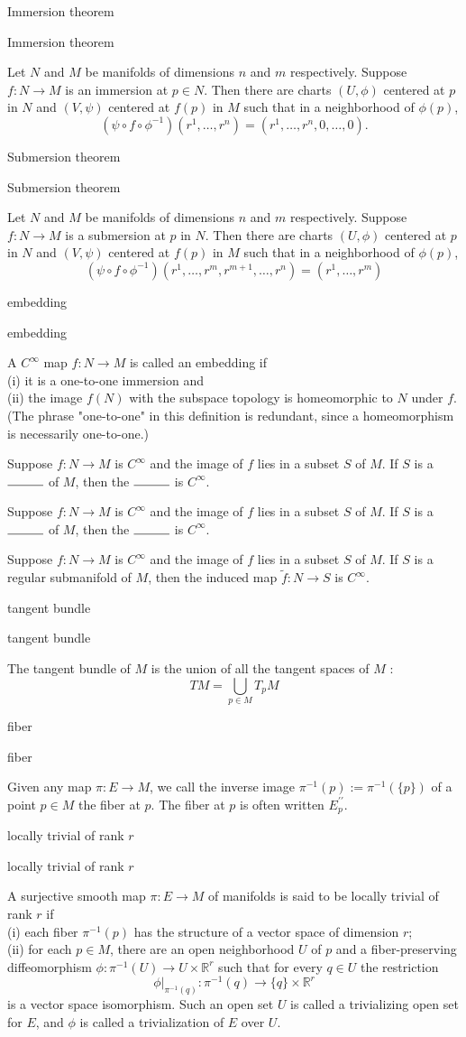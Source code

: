 \documentclass[17pt]{extarticle}
\newcommand{\boxset}[2]{\begin{mdframed}[style=darkQuesion]
#1
\end{mdframed}
\newpage
\begin{mdframed}[style=darkQuesion]
  #1
    \end{mdframed}
\begin{mdframed}[style=darkAnswer]
  #2
    \end{mdframed}
    \newpage
}
\begin{document}
\boxset{Immersion theorem}
{Let $N$ and $M$ be manifolds of dimensions $n$ and $m$ respectively. Suppose $f: N \rightarrow M$ is an immersion at $p \in N$. Then there are charts $(U, \phi)$ centered at $p$ in $N$ and $(V, \psi)$ centered at $f(p)$ in $M$ such that in a neighborhood of $\phi(p)$,
\[\left(\psi \circ f \circ \phi^{-1}\right)\left(r^{1}, \ldots, r^{n}\right)=\left(r^{1}, \ldots, r^{n}, 0, \ldots, 0\right) .\]}
\boxset{Submersion theorem}
{Let $N$ and $M$ be manifolds of dimensions $n$ and $m$ respectively. Suppose $f: N \rightarrow M$ is a submersion at $p$ in $N$. Then there are charts $(U, \phi)$ centered at $p$ in $N$ and $(V, \psi)$ centered at $f(p)$ in $M$ such that in a neighborhood of $\phi(p)$,
\[\left(\psi \circ f \circ \phi^{-1}\right)\left(r^{1}, \ldots, r^{m}, r^{m+1}, \ldots, r^{n}\right)=\left(r^{1}, \ldots, r^{m}\right)\]}
\boxset{embedding}
{A $C^{\infty}$ map $f: N \rightarrow M$ is called an embedding if\[\ \]
(i) it is a one-to-one immersion and\[\ \]
(ii) the image $f(N)$ with the subspace topology is homeomorphic to $N$ under $f$. (The phrase "one-to-one" in this definition is redundant, since a homeomorphism is necessarily one-to-one.)}
\boxset{Suppose $f: N \rightarrow M$ is $C^{\infty}$ and the image of $f$ lies in a subset $S$ of $M$. If $S$ is a $\rule{1cm}{0.15mm}$ of $M$, then the $\rule{1cm}{0.15mm}$ is $C^{\infty}$.}
{Suppose $f: N \rightarrow M$ is $C^{\infty}$ and the image of $f$ lies in a subset $S$ of $M$. If $S$ is a regular submanifold of $M$, then the induced map $\tilde{f}: N \rightarrow S$ is $C^{\infty}$.}
\boxset{tangent bundle}
{The tangent bundle of $M$ is the union of all the tangent spaces of $M$ :
\[T M=\bigcup_{p \in M} T_{p} M\]}
\boxset{fiber}
{Given any map $\pi: E \rightarrow M$, we call the inverse image $\pi^{-1}(p):=\pi^{-1}(\{p\})$ of a point $p \in M$ the fiber at $p$. The fiber at $p$ is often written $E_{p}^{\prime \prime}$.}
\boxset{locally trivial of rank $r$}
{A surjective smooth map $\pi: E \rightarrow M$ of manifolds is said to be locally trivial of rank $r$ if\[\ \]
(i) each fiber $\pi^{-1}(p)$ has the structure of a vector space of dimension $r$;\[\ \]
(ii) for each $p \in M$, there are an open neighborhood $U$ of $p$ and a fiber-preserving diffeomorphism $\phi: \pi^{-1}(U) \rightarrow U \times \mathbb{R}^{r}$ such that for every $q \in U$ the restriction
\[\left.\phi\right|_{\pi^{-1}(q)}: \pi^{-1}(q) \rightarrow\{q\} \times \mathbb{R}^{r}\]
is a vector space isomorphism. Such an open set $U$ is called a trivializing open set for $E$, and $\phi$ is called a trivialization of $E$ over $U$.}
\end{document}
